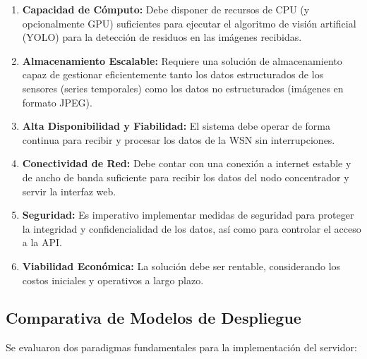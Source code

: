 \begin{enumerate}
    \item \textbf{Capacidad de Cómputo:} Debe disponer de recursos de CPU (y opcionalmente GPU) suficientes para ejecutar el algoritmo de visión artificial (YOLO) para la detección de residuos en las imágenes recibidas.
    \item \textbf{Almacenamiento Escalable:} Requiere una solución de almacenamiento capaz de gestionar eficientemente tanto los datos estructurados de los sensores (series temporales) como los datos no estructurados (imágenes en formato JPEG).
    \item \textbf{Alta Disponibilidad y Fiabilidad:} El sistema debe operar de forma continua para recibir y procesar los datos de la WSN sin interrupciones.
    \item \textbf{Conectividad de Red:} Debe contar con una conexión a internet estable y de ancho de banda suficiente para recibir los datos del nodo concentrador y servir la interfaz web.
    \item \textbf{Seguridad:} Es imperativo implementar medidas de seguridad para proteger la integridad y confidencialidad de los datos, así como para controlar el acceso a la API.
    \item \textbf{Viabilidad Económica:} La solución debe ser rentable, considerando los costos iniciales y operativos a largo plazo.
\end{enumerate}

\subsection*{Comparativa de Modelos de Despliegue}
\label{subsec:modelos_despliegue}

Se evaluaron dos paradigmas fundamentales para la implementación del servidor:

